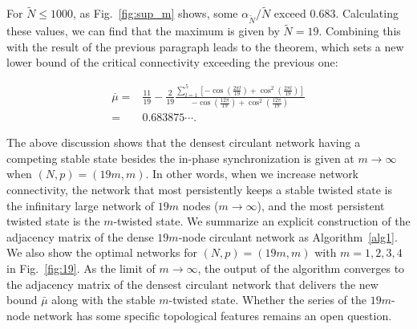 For $\widetilde{N}\leq 1000$, as Fig.~\ref{fig:sup_m} shows, some $\alpha_{\widetilde{N}}/\widetilde{N}$ exceed $0.683$. Calculating these values, we can find that the maximum is given by $\widetilde{N}=19$. Combining this with the result of the previous paragraph leads to the theorem, which sets a new lower bound of the critical connectivity exceeding the previous one:
\begin{theorem}
    \label{th:supmu}
    \begin{align}
        \overline{\mu} =& \frac{11}{19}-\frac{2}{19}\frac{\displaystyle\sum_{l=1}^{5}\left[-\cos\left(\frac{2\pi l}{19}\right)+\cos^{2}\left(\frac{2\pi l}{19}\right)\right]}{\displaystyle-\cos\left(\frac{12\pi}{19}\right)+\cos^{2}\left(\frac{12\pi}{19}\right)}\\
        =&0.683875\cdots.
    \end{align}
\end{theorem}

The above discussion shows that the densest circulant network having a competing stable state besides the in-phase synchronization is given at $m\to\infty$ when $(N,p)=(19m,m)$.
In other words, when we increase network connectivity, the network that most persistently keeps a stable twisted state is the infinitary large network of $19m$ nodes ($m\to\infty$), and the most persistent twisted state is the $m$-twisted state.
We summarize an explicit construction of the adjacency matrix of the dense $19m$-node circulant network as Algorithm~\ref{alg1}.
We also show the optimal networks for $(N,p)=(19m,m)$ with $m=1,2,3,4$ in Fig.~\ref{fig:19}.
As the limit of $m\to \infty$, the output of the algorithm converges to the adjacency matrix of the densest circulant network that delivers the new bound $\bar{\mu}$ along with the stable $m$-twisted state.
Whether the series of the $19m$-node network has some specific topological features remains an open question.


